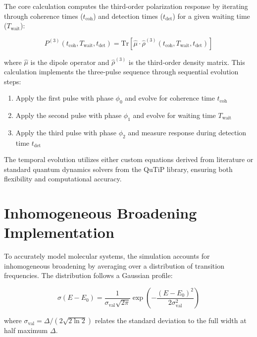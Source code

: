 \noindent
The core calculation computes the third-order polarization response by iterating through coherence times ($t_{\text{coh}}$) and detection times ($t_{\text{det}}$) for a given waiting time ($T_{\text{wait}}$):

\begin{equation}
	\label{eq:polarization_third_order}
	P^{(3)}(t_{\text{coh}}, T_{\text{wait}}, t_{\text{det}}) = \mathrm{Tr}[\hat{\mu} \cdot \hat{\rho}^{(3)}(t_{\text{coh}}, T_{\text{wait}}, t_{\text{det}})]
\end{equation}

\noindent
where $\hat{\mu}$ is the dipole operator and $\hat{\rho}^{(3)}$ is the third-order density matrix. This calculation implements the three-pulse sequence through sequential evolution steps:

\begin{enumerate}
	\item Apply the first pulse with phase $\phi_0$ and evolve for coherence time $t_{\text{coh}}$
	\item Apply the second pulse with phase $\phi_1$ and evolve for waiting time $T_{\text{wait}}$
	\item Apply the third pulse with phase $\phi_2$ and measure response during detection time $t_{\text{det}}$
\end{enumerate}

\noindent
The temporal evolution utilizes either custom equations derived from literature or standard quantum dynamics solvers from the QuTiP \cite{lambertetal2024qutip5quantum} library, ensuring both flexibility and computational accuracy.

\section{Inhomogeneous Broadening Implementation}
\label{sec:inhomogeneous_broadening}

\noindent
To accurately model molecular systems, the simulation accounts for inhomogeneous broadening by averaging over a distribution of transition frequencies. The distribution follows a Gaussian profile:

\begin{equation}
	\label{eq:gaussian_distribution}
	\sigma(E - E_0) = \frac{1}{\sigma_{\text{val}}\sqrt{2\pi}} \exp\left(-\frac{(E-E_0)^2}{2\sigma_{\text{val}}^2}\right)
\end{equation}

\noindent
where $\sigma_{\text{val}} = \Delta/(2\sqrt{2\ln{2}})$ relates the standard deviation to the full width at half maximum $\Delta$.


